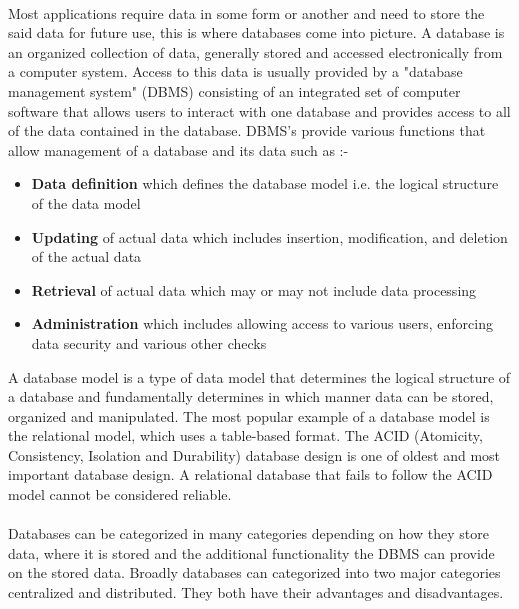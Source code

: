 \documentclass{article}
\begin{document}
        \paragraph{}
        Most applications require data in some form or another and need to store the said data for future use, this is where databases come into picture.
        A database is an organized collection of data, generally stored and accessed electronically from a computer system.
        Access to this data is usually provided by a "database management system" (DBMS) consisting of an integrated set of computer software that allows users to interact with one database and provides access to all of the data contained in the database.
        DBMS's provide various functions that allow management of a database and its data such as :-
        \begin{itemize}
            \item \textbf{Data definition} which defines the database model i.e. the logical structure of the data model
            \item \textbf{Updating} of actual data which includes insertion, modification, and deletion of the actual data
            \item \textbf{Retrieval} of actual data which may or may not include data processing
            \item \textbf{Administration} which includes allowing access to various users, enforcing data security and various other checks
        \end{itemize}
        A database model is a type of data model that determines the logical structure of a database and fundamentally determines in which manner data can be stored, organized and manipulated. The most popular example of a database model is the relational model, which uses a table-based format. The ACID (Atomicity, Consistency, Isolation and Durability) database design is one of oldest and most important database design. A relational database that fails to follow the ACID model cannot be considered reliable. 
        \paragraph{}
        Databases can be categorized in many categories depending on how they store data, where it is stored and the additional functionality the DBMS can provide on the stored data. Broadly databases can categorized into two major categories centralized and distributed. They both have their advantages and disadvantages.
\end{document}
